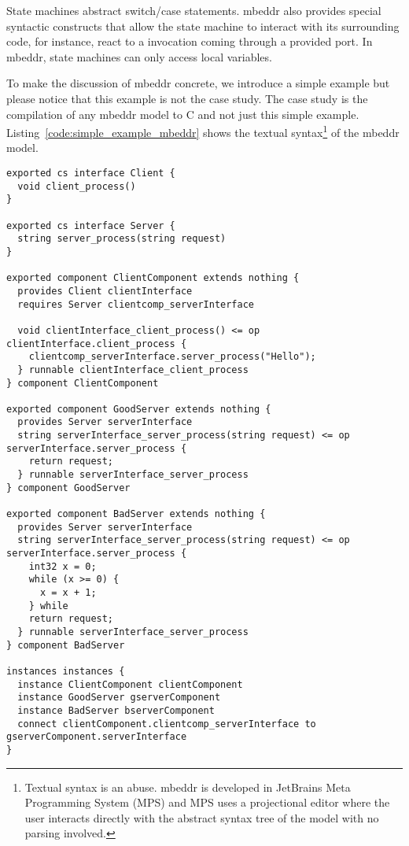 State machines abstract switch/case statements. mbeddr also provides special syntactic constructs that allow the state machine to interact with its surrounding code, for instance, react to a invocation coming through a provided port. In mbeddr, state machines can only access local variables.

To make the discussion of mbeddr concrete, we introduce a simple example but please notice that this example is not the case study. The case study is the compilation of any mbeddr model to C and not just this simple example.
Listing~\ref{code:simple_example_mbeddr} shows the textual syntax\footnote{Textual syntax is an abuse. mbeddr is developed in JetBrains Meta Programming System (MPS) and MPS uses a projectional editor where the user interacts directly with the abstract syntax tree of the model with no parsing involved.} of the mbeddr model.


\begin{lstlisting}[float]
exported cs interface Client { 
  void client_process() 
} 

exported cs interface Server { 
  string server_process(string request) 
} 

exported component ClientComponent extends nothing { 
  provides Client clientInterface 
  requires Server clientcomp_serverInterface 
   
  void clientInterface_client_process() <= op clientInterface.client_process { 
    clientcomp_serverInterface.server_process("Hello"); 
  } runnable clientInterface_client_process 
} component ClientComponent 

exported component GoodServer extends nothing { 
  provides Server serverInterface 
  string serverInterface_server_process(string request) <= op serverInterface.server_process { 
    return request; 
  } runnable serverInterface_server_process 
} component GoodServer 

exported component BadServer extends nothing { 
  provides Server serverInterface 
  string serverInterface_server_process(string request) <= op serverInterface.server_process { 
    int32 x = 0; 
    while (x >= 0) { 
      x = x + 1; 
    } while 
    return request; 
  } runnable serverInterface_server_process 
} component BadServer 

instances instances { 
  instance ClientComponent clientComponent 
  instance GoodServer gserverComponent 
  instance BadServer bserverComponent 
  connect clientComponent.clientcomp_serverInterface to gserverComponent.serverInterface
}
\end{lstlisting}

